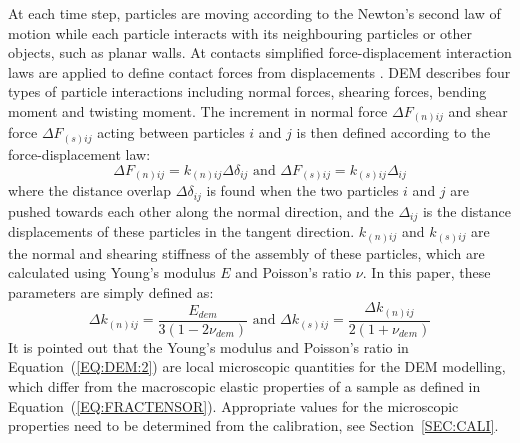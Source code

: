 \documentclass[review,authoryear]{elsarticle}
\begin{document}
At each time step, particles are moving according to the Newton's second law of motion while each particle interacts with its neighbouring particles or other objects, such as planar walls. At contacts simplified force-displacement interaction laws are applied to define contact forces from displacements \citep{cundall1979discrete}. DEM describes four types of particle interactions including normal forces, shearing forces, bending moment and twisting moment. The increment in 
normal force $\Delta F_{(n)ij}$ and shear force $\Delta F_{(s)ij}$ acting between particles $i$ and $j$ is then defined according to the force-displacement law:
\begin{equation}\label{EQ:DEM:1}
  \Delta F_{(n)ij} = k_{(n)ij}\Delta \delta_{ij} \mbox{ and } \Delta F_{(s)ij} = k_{(s)ij}\Delta_{ij} 
  \end{equation}
where the distance overlap $\Delta \delta_{ij}$ is found when the two particles $i$ and $j$  are pushed towards each other along the normal direction, and the $\Delta_{ij}$ is the distance displacements of these particles in the tangent direction. $k_{(n)ij}$ and $k_{(s)ij}$ are the normal and shearing stiffness of the assembly of these particles, which are calculated using Young's modulus $E$ and Poisson's ratio $\nu$. In this paper, these parameters are simply defined as:
\begin{equation}\label{EQ:DEM:2}
  \Delta k_{(n)ij} = \frac{E_{dem}}{3(1-2\nu_{dem})} \mbox{ and } \Delta k_{(s)ij} = \frac{\Delta k_{(n)ij}}{2(1+\nu_{dem})} 
  \end{equation}
It is pointed out that the Young's modulus and Poisson's ratio in Equation~(\ref{EQ:DEM:2}) are local microscopic quantities for the DEM modelling, which differ from the macroscopic elastic properties of a sample as defined in Equation~(\ref{EQ:FRACTENSOR}). Appropriate values for the microscopic properties need to be determined from the calibration,  see Section~\ref{SEC:CALI}.
\end{document}
